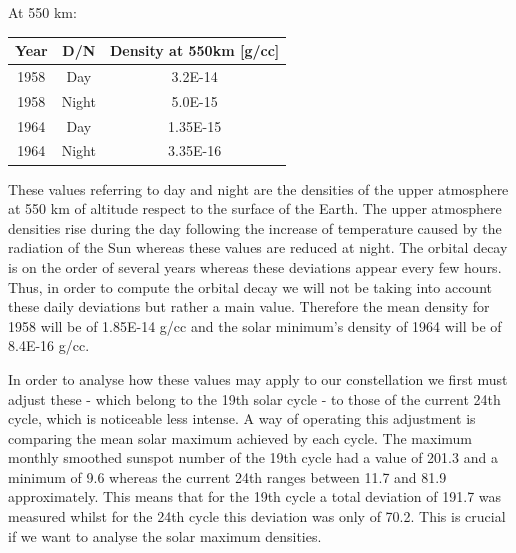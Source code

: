 At 550 km:

\begin{center}
 \begin{tabular}{||c| c| c||} 
 \hline\hline
Year & D/N & Density at 550km [g/cc]\\ [1ex] 
 \hline
 1958 & Day & 3.2E-14 \\ [1ex]
 \hline
 1958 & Night & 5.0E-15\\[1ex]
 \hline
 1964 & Day & 1.35E-15 \\[1ex]
 \hline
 1964 & Night & 3.35E-16 \\[1ex]
 \hline\hline
\end{tabular}
\end{center}

These values referring to day and night are the densities of the upper atmosphere at 550 km of altitude respect to the surface of the Earth. The upper atmosphere densities rise during the day following the increase of temperature caused by the radiation of the Sun whereas these values are reduced at night. The orbital decay is on the order of several years whereas these deviations appear every few hours. Thus, in order to compute the orbital decay we will not be taking into account these daily deviations but rather a main value. Therefore the mean density for 1958 will be of 1.85E-14 g/cc and the solar minimum's density of 1964 will be of 8.4E-16 g/cc. 

In order to analyse how these values may apply to our constellation we first must adjust these - which belong to the 19th solar cycle - to those of the current 24th cycle, which is noticeable less intense. A way of operating this adjustment is comparing the mean solar maximum achieved by each cycle. The maximum monthly smoothed sunspot number of the 19th cycle had a value of 201.3 and a minimum of 9.6 whereas the current 24th ranges between 11.7 and 81.9 approximately. This means that for the 19th cycle a total deviation of 191.7 was measured whilst for the 24th cycle this deviation was only of 70.2. This is crucial if we want to analyse the solar maximum densities.

